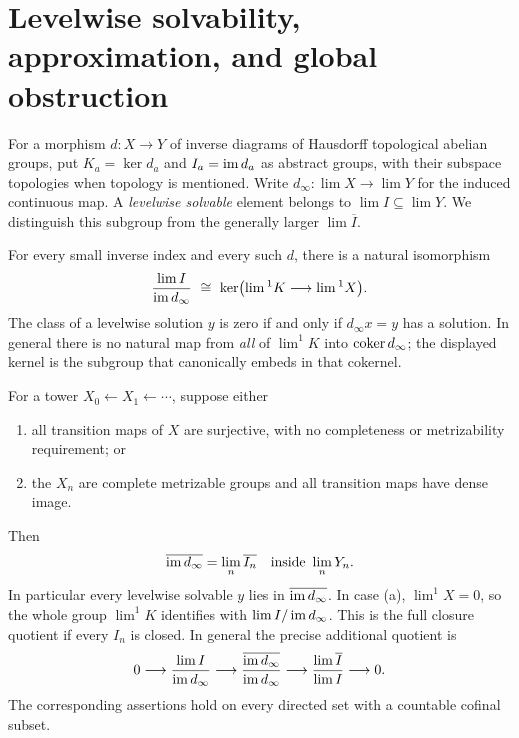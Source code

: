 \section{Levelwise solvability, approximation, and global obstruction}
\label{sec:E}

For a morphism $d:X\to Y$ of inverse diagrams of Hausdorff topological abelian groups, put $K_a=\ker d_a$ and $I_a=\operatorname{im} d_a$ as abstract groups, with their subspace topologies when topology is mentioned. Write $d_\infty:\lim X\to\lim Y$ for the induced continuous map. A \emph{levelwise solvable} element belongs to $\lim I\subseteq\lim Y$. We distinguish this subgroup from the generally larger $\lim\overline I$.

\begin{theorem}\label{E:obstruction}
For every small inverse index and every such $d$, there is a natural isomorphism
\[
 \frac{\lim I}{\operatorname{im} d_\infty}
 \ \cong\ \ker\bigl(\lim{}^1K\longrightarrow\lim{}^1X\bigr).
\]
The class of a levelwise solution $y$ is zero if and only if $d_\infty x=y$ has a solution. In general there is no natural map from \emph{all} of $\lim^1K$ into $\operatorname{coker} d_\infty$; the displayed kernel is the subgroup that canonically embeds in that cokernel.

For a tower $X_0\leftarrow X_1\leftarrow\cdots$, suppose either
\begin{enumerate}[label=(\alph*)]
\item all transition maps of $X$ are surjective, with no completeness or metrizability requirement; or
\item the $X_n$ are complete metrizable groups and all transition maps have dense image.
\end{enumerate}
Then
\[
 \overline{\operatorname{im} d_\infty}=\lim_n\overline{I_n}
 \quad\text{inside }\lim_nY_n.
\]
In particular every levelwise solvable $y$ lies in $\overline{\operatorname{im} d_\infty}$. In case (a), $\lim^1X=0$, so the whole group $\lim^1K$ identifies with $\lim I/\operatorname{im} d_\infty$. This is the full closure quotient if every $I_n$ is closed. In general the precise additional quotient is
\[
 0\longrightarrow \frac{\lim I}{\operatorname{im} d_\infty}
 \longrightarrow \frac{\overline{\operatorname{im} d_\infty}}{\operatorname{im} d_\infty}
 \longrightarrow \frac{\lim\overline I}{\lim I}\longrightarrow0.
\]
The corresponding assertions hold on every directed set with a countable cofinal subset.
\end{theorem}
